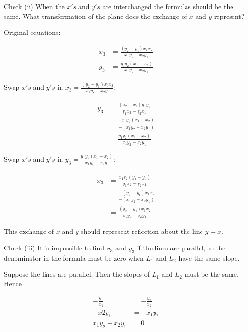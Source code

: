 \documentclass[9pt]{article}
\begin{document}
\begin{tcolorbox}
  Check (ii) When the $x's$ and $y's$ are interchanged the formulas should be the same. What transformation of the plane does the exchange of $x$ and $y$ represent?
\end{tcolorbox}

Original equations:

\begin{align*}
  x_3 &= \frac{(y_2 - y_1) x_1 x_2}{x_1 y_2 - x_2 y_1} \\
  y_3 &= \frac{y_1 y_2 (x_1 - x_2)}{x_1 y_2 - x_2 y_1}
\end{align*}

Swap $x's$ and $y's$ in $x_3 = \frac{(y_2 - y_1) x_1 x_2}{x_1 y_2 - x_2 y_1}$:

\begin{align*}
  y_3 &= \frac{(x_2 - x_1) y_1 y_2}{y_1 x_2 - y_2 x_1} \\
      &= \frac{- y_1 y_2 (x_1 - x_2)}{-(x_1 y_2 - x_2 y_1)} \\
      &= \frac{y_1 y_2 (x_1 - x_2)}{x_1 y_2 - x_2 y_1}
\end{align*}

Swap $x's$ and $y's$ in $y_3 = \frac{y_1 y_2 (x_1 - x_2)}{x_1 y_2 - x_2 y_1}$:

\begin{align*}
  x_3 &= \frac{x_1 x_2 (y_1 - y_2)}{y_1 x_2 - y_2 x_1} \\
      &= \frac{-(y_2 - y_1) x_1 x_2}{-(x_1 y_2 - x_2 y_1)} \\
      &= \frac{(y_2 - y_1) x_1 x_2}{x_1 y_2 - x_2 y_1}
\end{align*}

This exchange of $x$ and $y$ should represent reflection about the line $y = x$.

\begin{tcolorbox}
  Check (iii) It is impossible to find $x_3$ and $y_3$ if the lines are parallel, so the denominator in the formula must be zero when $L_1$ and $L_2$ have the same slope.
\end{tcolorbox}

Suppose the lines are parallel. Then the slopes of $L_1$ and $L_2$ must be the same. Hence

\begin{align*}
  -\frac{y_1}{x_1} &= -\frac{y_2}{x_2} \\
  -x2 y_1 &= -x_1 y_2 \\
  x_1 y_2 - x_2 y_1 &= 0
\end{align*}
\end{document}
